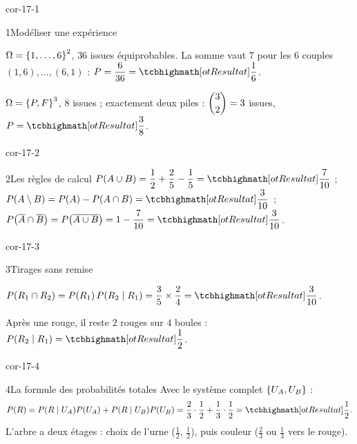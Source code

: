 
\corrigesSouples

\begin{blocLivre}{cor-17-1}
\begin{corrige}{1}{Modéliser une expérience}
\begin{questions}
  \item $\Omega=\left\{1,\dots,6\right\}^{2}$, $36$ issues équiprobables. La somme
    vaut $7$ pour les $6$ couples $(1,6),\dots,(6,1)$ :
    $P=\dfrac{6}{36}=\res{\dfrac16}$.
  \item $\Omega=\left\{P,F\right\}^{3}$, $8$ issues ; exactement deux piles :
    $\dbinom32=3$ issues, $P=\res{\dfrac38}$.
\end{questions}
\end{corrige}
\end{blocLivre}

\begin{blocLivre}{cor-17-2}
\begin{corrige}{2}{Les règles de calcul}
$P(A\cup B)=\dfrac12+\dfrac25-\dfrac15=\res{\dfrac{7}{10}}$ ;
$P(A\setminus B)=P(A)-P(A\cap B)=\res{\dfrac{3}{10}}$ ;
$P\bigl(\overline A\cap\overline B\bigr)
=P\bigl(\overline{A\cup B}\bigr)=1-\dfrac{7}{10}=\res{\dfrac{3}{10}}$.
\end{corrige}
\end{blocLivre}

\begin{blocLivre}{cor-17-3}
\begin{corrige}{3}{Tirages sans remise}
\begin{questions}
  \item $P(R_1\cap R_2)=P(R_1)\,P(R_2\mid R_1)
    =\dfrac35\times\dfrac24=\res{\dfrac{3}{10}}$.
  \item Après une rouge, il reste $2$ rouges sur $4$ boules :
    $P(R_2\mid R_1)=\res{\dfrac12}$.
\end{questions}
\end{corrige}
\end{blocLivre}

\begin{blocLivre}{cor-17-4}
\begin{corrige}{4}{La formule des probabilités totales}
Avec le système complet $\left\{U_A,U_B\right\}$ :
\[
P(R)=P(R\mid U_A)P(U_A)+P(R\mid U_B)P(U_B)
=\frac23\cdot\frac12+\frac13\cdot\frac12=\res{\frac12} .
\]
L'arbre a deux étages : choix de l'urne ($\frac12$, $\frac12$), puis
couleur ($\frac23$ ou $\frac13$ vers le rouge).
\end{corrige}
\end{blocLivre}

